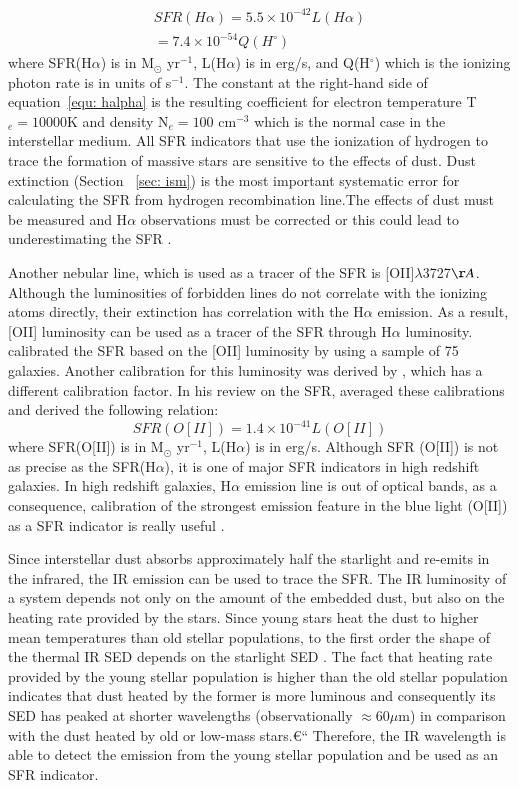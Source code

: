 \begin{align}
\label{equ: halpha}
SFR(H\alpha) = 5.5 \times 10^{-42}L(H\alpha) \\
                     = 7.4 \times 10^{-54}Q(H^{\circ})
\end{align}
where SFR(H$\alpha$) is in M$_{\odot}$ yr$^{-1}$, L(H$\alpha$) is in erg/s, and Q(H$^{\circ}$) which is the ionizing photon rate is in units of s$^{-1}$. The constant at the right-hand side of equation~\ref{equ: halpha} is the resulting coefficient for electron temperature T$_e=10000$K and density N$_e=100$ cm$^{-3}$ which is the normal case in the interstellar medium. All SFR indicators that use the ionization of hydrogen to trace the formation of massive stars are sensitive to the effects of dust. Dust extinction (Section ~\ref{sec: ism}) is the most important systematic error for calculating the SFR from hydrogen recombination line.The effects of dust must be measured and H$\alpha$ observations must be corrected or this could lead to underestimating the SFR \citep{Kennicutt98b}. 

Another nebular line, which is used as a tracer of the SFR is [OII]$\lambda$3727$\AA$. Although the luminosities of forbidden lines do not correlate with the ionizing atoms directly, their extinction has correlation with the H$\alpha$ emission. As a result, [OII] luminosity can be used as a tracer of the SFR through H$\alpha$ luminosity. \cite{Gallagher89} calibrated the SFR based on the [OII] luminosity by using a sample of 75 galaxies. Another calibration for this luminosity was derived by \cite{Kennicutt92}, which has a different calibration factor. In his review on the SFR, \citep{Kennicutt98b} averaged these calibrations and derived the following relation:
\begin{equation}
SFR(O[II]) = 1.4 \times 10^{-41} L(O[II])
\end{equation}  
where SFR(O[II]) is in M$_{\odot}$ yr$^{-1}$, L(H$\alpha$) is in erg/s. Although SFR (O[II]) is not as precise as the SFR(H$\alpha$), it is one of major SFR indicators in high redshift galaxies. In high redshift galaxies, H$\alpha$ emission line is out of optical bands, as a consequence, calibration of the strongest emission feature in the blue light (O[II]) as a SFR indicator is really useful \citep{Kennicutt98b}.


Since interstellar dust absorbs approximately half the starlight and re-emits in the infrared, the IR emission can be used to trace the SFR. The IR luminosity of a system depends not only on the amount of the embedded dust, but also on the heating rate provided by the stars. Since young stars heat the dust to higher mean temperatures than old stellar populations, to the first order the shape of the thermal IR SED depends on the starlight SED \citep{Helou86}. The fact that heating rate provided by the young stellar population is higher than the old stellar population indicates that dust heated by the former is more luminous and consequently its SED has peaked at shorter wavelengths (observationally $\approx 60  \mu$m) in comparison with the dust heated by old or low-mass stars.€“ Therefore, the IR wavelength is able to detect the emission from the young stellar population and be used as an SFR indicator.  

